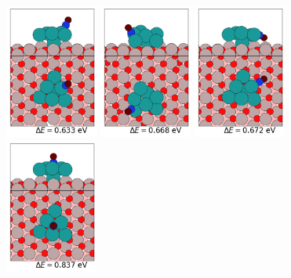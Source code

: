 \documentclass{article}
\begin{document}
\begin{figure}[htp]
\begin{center}
{}
\subfigure
{
  \includegraphics[width=1.2in]{Pt7CO_Al2O3_Lowlying_DFTrelxed_5.png}
}
\subfigure
{
  \includegraphics[width=1.2in]{Pt7CO_Al2O3_Lowlying_DFTrelxed_6.png}
}
\subfigure
{
  \includegraphics[width=1.2in]{Pt7CO_Al2O3_Lowlying_DFTrelxed_7.png}
}
\subfigure
{
  \includegraphics[width=1.2in]{Pt7CO_Al2O3_Lowlying_DFTrelxed_9.png}
}

\end{center}
\end{figure}
\end{document}

